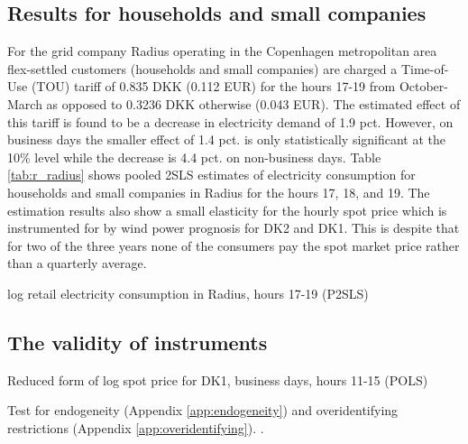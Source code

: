 \subsection{Results for households and small companies}
\label{subsec:r_households}
For the grid company Radius operating in the Copenhagen metropolitan area flex-settled customers (households and small companies) are charged a Time-of-Use (TOU) tariff of 0.835 DKK (0.112 EUR) for the hours 17-19 from October-March as opposed to 0.3236 DKK otherwise (0.043 EUR). The estimated effect of this tariff is found to be a decrease in electricity demand of 1.9 pct. However, on business days the smaller effect of 1.4 pct. is only statistically significant at the 10\% level while the decrease is 4.4 pct. on non-business days. Table \ref{tab:r_radius} shows pooled 2SLS estimates of electricity consumption for households and small companies in Radius for the hours 17, 18, and 19. The estimation results also show a small elasticity for the hourly spot price which is instrumented for by wind power prognosis for DK2 and DK1. This is despite that for two of the three years none of the consumers pay the spot market price rather than a quarterly average.
\begin{table}[H]
  \vspace{-0.0cm}
  \centering
  \caption{log retail electricity consumption in Radius, hours 17-19 (P2SLS)}
  \label{tab:r_radius}
  \footnotesize
        
  \vspace{-0.0cm}
\end{table}


\subsection{The validity of instruments}
\label{subsec:r_validity}

\begin{table}[H]
  \centering
  \caption{Reduced form of log spot price for DK1, business days, hours 11-15 (POLS)}
  \label{tab:reduced_form_price_dk1}
  \footnotesize
        
\end{table}
Test for endogeneity (Appendix \ref{app:endogeneity}) and overidentifying restrictions (Appendix \ref{app:overidentifying}). \citep{statacorp2017stata}.
\medskip\\


